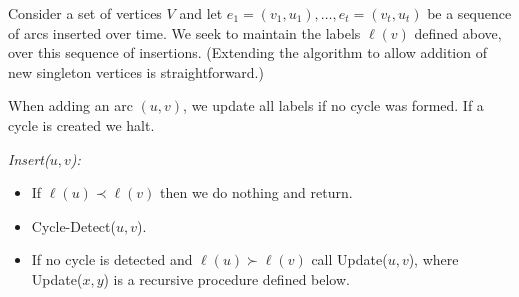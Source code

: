 \documentclass[11pt]{article}
\theoremstyle{plain}
\theoremstyle{definition}
\theoremstyle{remark}
\numberwithin{equation}{section}
\DeclareMathOperator{\glex}{\prec}
\DeclareMathOperator{\llex}{\succ}
\begin{document}
Consider a set of vertices $V$ and let $e_1=(v_1,u_1), \ldots,
e_t=(v_t,u_t)$ be a sequence of arcs inserted over time. We seek to
maintain the labels $\ell(v)$ defined above, over this sequence of
insertions. (Extending the algorithm to allow addition of new
singleton vertices is straightforward.)

When adding an arc $(u,v)$, we update all labels if no cycle was
formed. If a cycle is created we halt.


\emph{Insert($u,v$):}
\begin{itemize}
\item If $\ell(u) \glex \ell(v)$ then we do nothing and return.
\item Cycle-Detect($u,v$).
\item If no cycle is detected and $\ell(u)\llex \ell(v)$ call Update($u,v$), where Update($x,y$) is a recursive procedure defined below.
\end{itemize}
\end{document}
